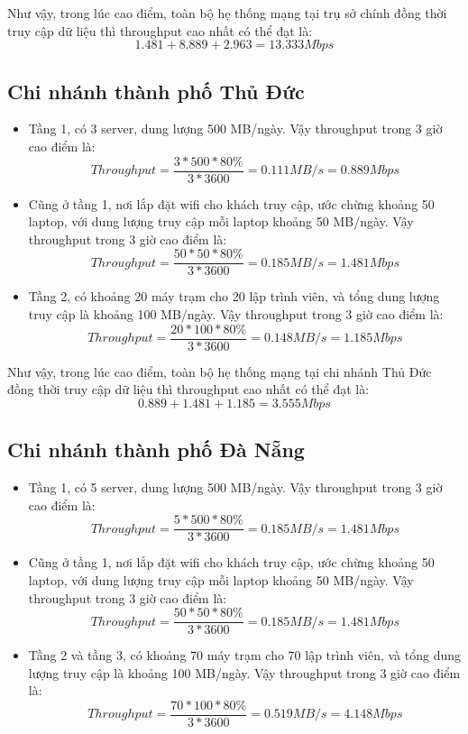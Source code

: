 \documentclass[a4paper]{article}
\begin{document}
Như vậy, trong lúc cao điểm, toàn bộ hẹ thống mạng tại trụ sở chính đồng thời truy cập dữ liệu thì throughput cao nhất có thể đạt là:
\[1.481 + 8.889 + 2.963 = 13.333 Mbps\]

\subsection{Chi nhánh thành phố Thủ Đức}
\begin{itemize}
    \item Tầng 1, có 3 server, dung lượng 500 MB/ngày. Vậy throughput trong 3 giờ cao điểm là:\\
    \[Throughput = \frac{3 * 500 * 80\%}{3 * 3600} = 0.111 MB/s = 0.889 Mbps\]
    \item Cũng ở tầng 1, nơi lắp đặt wifi cho khách truy cập, ước chừng khoảng 50 laptop, với dung lượng truy cập mỗi laptop khoảng 50 MB/ngày. Vậy throughput trong 3 giờ cao điểm là:\\
    \[Throughput = \frac{50 * 50 * 80\%}{3 * 3600} = 0.185 MB/s = 1.481 Mbps\]
    \item Tầng 2, có khoảng 20 máy trạm cho 20 lập trình viên, và tổng dung lượng truy cập là khoảng 100 MB/ngày. Vậy throughput trong 3 giờ cao điểm là:\\
    \[Throughput = \frac{20 * 100 * 80\%}{3 * 3600} = 0.148 MB/s = 1.185 Mbps\]
\end{itemize}

Như vậy, trong lúc cao điểm, toàn bộ hẹ thống mạng tại chi nhánh Thủ Đức đồng thời truy cập dữ liệu thì throughput cao nhất có thể đạt là:
\[0.889 + 1.481 + 1.185 = 3.555 Mbps\]

\subsection{Chi nhánh thành phố Đà Nẵng}
\begin{itemize}
    \item Tầng 1, có 5 server, dung lượng 500 MB/ngày. Vậy throughput trong 3 giờ cao điểm là:\\
    \[Throughput = \frac{5 * 500 * 80\%}{3 * 3600} = 0.185 MB/s = 1.481 Mbps\]
    \item Cũng ở tầng 1, nơi lắp đặt wifi cho khách truy cập, ước chừng khoảng 50 laptop, với dung lượng truy cập mỗi laptop khoảng 50 MB/ngày. Vậy throughput trong 3 giờ cao điểm là:\\
    \[Throughput = \frac{50 * 50 * 80\%}{3 * 3600} = 0.185 MB/s = 1.481 Mbps\]
    \item Tầng 2 và tầng 3, có khoảng 70 máy trạm cho 70 lập trình viên, và tổng dung lượng truy cập là khoảng 100 MB/ngày. Vậy throughput trong 3 giờ cao điểm là:\\
    \[Throughput = \frac{70 * 100 * 80\%}{3 * 3600} = 0.519 MB/s = 4.148 Mbps\]
\end{itemize}
\end{document}
